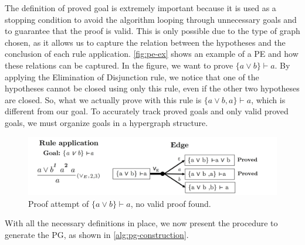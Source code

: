 The definition of proved goal is extremely important because it is used as a stopping condition to avoid the algorithm looping through unnecessary goals and to guarantee that the proof is valid. This is only possible due to the type of graph chosen, as it allows us to capture the relation between the hypotheses and the conclusion of each rule application. \autoref{fig:pe-ex} shows an example of a PE and how these relations can be captured. In the figure, we want to prove \(\{a \vee b\} \vdash a\). By applying the Elimination of Disjunction rule, we notice that one of the hypotheses cannot be closed using only this rule, even if the other two hypotheses are closed. So, what we actually prove with this rule is \(\{a \vee b, a\} \vdash a\), which is different from our goal. To accurately track proved goals and only valid proved goals, we must organize goals in a hypergraph structure.

\begin{figure}[h]
    \centering
    \includegraphics[width=1\linewidth]{resources/pe-example.jpg}
    \caption{Proof attempt of $\{a \lor b\} \vdash a$, no valid proof found.}
    \label{fig:pe-ex}
\end{figure}

\vspace{1em}
With all the necessary definitions in place, we now present the procedure to generate the PG, as shown in \autoref{alg:pg-construction}.

